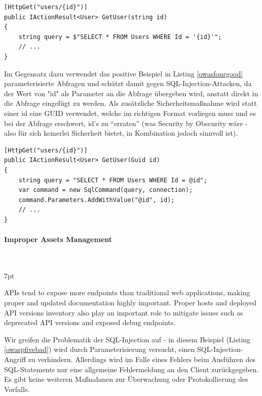 \documentclass[notitlepage, hidelinks]{article}
\newenvironment{formal}{%
  \def\FrameCommand{%
    \hspace{1pt}%
    {\color{black}\vrule width 2pt}%
    {\color{formalshade}\vrule width 4pt}%
    \colorbox{formalshade}%
  }%
  \MakeFramed{\advance\hsize-\width\FrameRestore}%
  \noindent\hspace{-4.55pt}%
  \begin{adjustwidth}{}{7pt}%
  \vspace{2pt}\vspace{2pt}%
}
{%
  \vspace{2pt}\end{adjustwidth}\endMakeFramed%
}
\begin{document}
\begin{lstlisting}[language={[Sharp]C},frame=single,caption=Negativbeispiel Injection,label=owaspfourbad]
[HttpGet("users/{id}")]
public IActionResult<User> GetUser(string id)
{
    string query = $"SELECT * FROM Users WHERE Id = '{id}'";
    // ...
}
\end{lstlisting}

Im Gegensatz dazu verwendet das positive Beispiel in Listing \ref{owasfourgood} parameterisierte Abfragen und schützt damit gegen SQL-Injection-Attacken, da der Wert von "id" als Parameter an die Abfrage übergeben wird, anstatt direkt in die Abfrage eingefügt zu werden. Als zusätzliche Sicherheitsmaßnahme wird statt einer id eine GUID verwendet, welche im richtigen Format vorliegen muss und es bei der Abfrage erschwert, id's zu ``erraten'' (was Security by Obscurity wäre - also für sich keinerlei Sicherheit bietet, in Kombination jedoch sinnvoll ist).

\begin{lstlisting}[language={[Sharp]C},frame=single,caption=Positivbeispiel Injection,label=owaspfourgood]
[HttpGet("users/{id}")]
public IActionResult<User> GetUser(Guid id)
{
    string query = "SELECT * FROM Users WHERE Id = @id";
    var command = new SqlCommand(query, connection);
    command.Parameters.AddWithValue("@id", id);
    // ...
}
\end{lstlisting}


\paragraph{Improper Assets Management} \mbox{} \\
\begin{formal}
APIs tend to expose more endpoints than traditional web applications, making proper and updated documentation highly important. Proper hosts and deployed API versions inventory also play an important role to mitigate issues such as deprecated API versions and exposed debug endpoints.
\end{formal}

Wir greifen die Problematik der SQL-Injection auf - in diesem Beispiel (Listing \ref{owaspfivebad}) wird durch Parameterisierung versucht, einen SQL-Injection-Angriff zu verhindern. Allerdings wird im Falle eines Fehlers beim Ausführen des SQL-Statements nur eine allgemeine Fehlermeldung an den Client zurückgegeben. Es gibt keine weiteren Maßnahmen zur Überwachung oder Protokollierung des Vorfalls.
\end{document}
